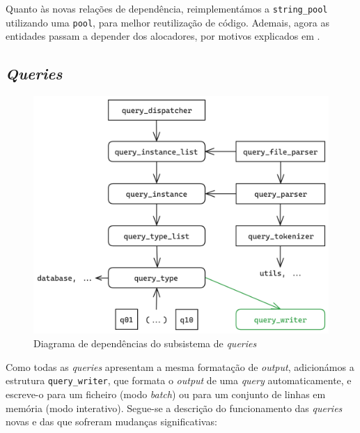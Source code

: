 \documentclass[12pt, a4paper]{article}
\begin{document}
Quanto às novas relações de dependência, reimplementámos a \texttt{string\_pool} utilizando uma
\texttt{pool}, para melhor reutilização de código. Ademais, agora as entidades passam a depender
dos alocadores, por motivos explicados em .

\subsection{\emph{Queries}}
\label{sec:queries}

\begin{figure}[ht]
    \centering
    \includegraphics[scale=0.17]{res-fase2/queries.png}
	\caption{Diagrama de dependências do subsistema de \emph{queries}}
    \label{fig:queries}
\end{figure}

Como todas as \emph{queries} apresentam a mesma formatação de \emph{output}, adicionámos a estrutura
\texttt{query\_writer}, que formata o \emph{output} de uma \emph{query} automaticamente, e escreve-o
para um ficheiro (modo \emph{batch}) ou para um conjunto de linhas em memória (modo interativo).
Segue-se a descrição do funcionamento das \emph{queries} novas e das que sofreram mudanças
significativas:
\end{document}
